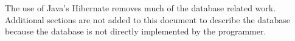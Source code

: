 \documentclass{article}
\begin{document}
The use of Java's Hibernate removes much of the database related work.  Additional
sections are not added to this document to describe the database because the
database is not directly implemented by the programmer.




\end{document}
